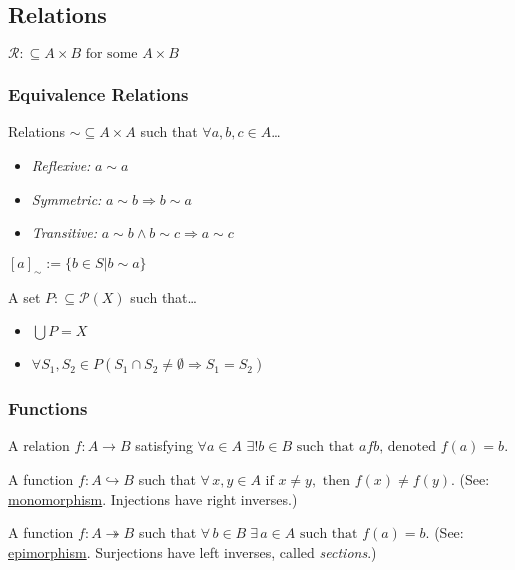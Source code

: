 \subsection{Relations}\label{relations}
$\mathcal{R} :\subseteq A \times B \textrm{ for some } A \times B$

\subsubsection{Equivalence Relations}\label{equivalencerelation}
Relations $\sim \subseteq A \times A$ such that $\forall a,b,c \in A$\dots
\begin{itemize}
  \item \emph{Reflexive:} $a \sim a$
  \item \emph{Symmetric:} $a \sim b \Rightarrow b \sim a$
  \item \emph{Transitive:} $a \sim b \land b \sim c \Rightarrow a \sim c$
\end{itemize}

$[a]_{\sim} := \{ b \in S | b \sim a \}$ 

A set $P :\subseteq \mathcal{P}(X)$ such that\dots
\begin{itemize}
  \item $\bigcup P = X$
  \item $\forall S_1, S_2 \in P (S_1 \cap S_2 \neq \emptyset \Rightarrow S_1 = S_2)$
\end{itemize}

\subsubsection{Functions}\label{function}
A relation $f: A \rightarrow B$ satisfying $\forall a \in A$ \mbox{$\exists! b \in B \textrm{ such that } afb \textrm{, denoted } f(a) = b$.}

\label{injection}
A function $\ensuremath{f: A \hookrightarrow B}$ such that $\forall \, x,y \in A \textrm{ if } x \neq y, \textrm{ then } f(x) \neq f(y)$. (See: \hyperref[monomorphism]{monomorphism}. Injections have right inverses.)

\label{surjection}
A function $\ensuremath{f: A \twoheadrightarrow B}$ such that $\forall \, b \in B \; \exists \, a \in A \textrm{ such that } f(a) = b$. (See: \hyperref[epimorphism]{epimorphism}. Surjections have left inverses, called \emph{sections}.)

